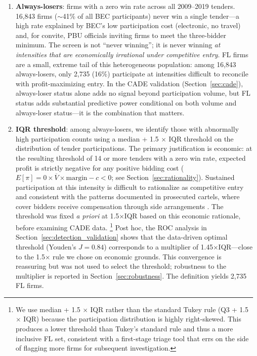 \begin{enumerate}
  \item \textbf{Always-losers}: firms with a zero win rate across all
    2009--2019 tenders. 16,843 firms ($\sim$41\% of all
    BEC participants) never win a single tender---a high rate
    explained by BEC's low participation cost (electronic, no travel)
    and, for convite, PBU officials inviting firms to meet the
    three-bidder minimum. The screen is not ``never winning''; it is
    never winning \emph{at intensities that are economically irrational
    under competitive entry}. FL firms are a small, extreme tail of
    this heterogeneous population: among 16,843 always-losers, only
    2,735 (16\%) participate at intensities difficult to reconcile with
    profit-maximizing entry. In the CADE validation
    (Section~\ref{sec:cade}), always-loser status alone adds no signal
    beyond participation volume, but FL status adds substantial
    predictive power conditional on both volume and always-loser
    status---it is the combination that matters.
  \item \textbf{IQR threshold}: among always-losers, we identify those
    with abnormally high participation counts using a median + 1.5
    $\times$ IQR threshold on the distribution of tender
    participations. The primary justification is economic: at the
    resulting threshold of 14 or more tenders with a zero win rate,
    expected profit is strictly negative for any positive bidding cost
    ($E[\pi] = 0 \times \overline{V} \times \text{margin} - c < 0$;
    see Section~\ref{sec:rationality}). Sustained participation at this
    intensity is difficult to rationalize as competitive entry and
    consistent with the patterns documented in prosecuted cartels,
    where cover bidders receive compensation through side arrangements
    \citep{asker2010leniency, marshall2012economics}. The
    threshold was fixed \emph{a priori} at 1.5$\times$IQR based on
    this economic rationale, before examining CADE data.%
    \footnote{We use median + 1.5 $\times$ IQR rather than the standard
    Tukey rule (Q3 + 1.5 $\times$ IQR) because the participation
    distribution is highly right-skewed. This produces a lower threshold
    than Tukey's standard rule and thus a more inclusive FL set,
    consistent with a first-stage triage tool that errs on the side of
    flagging more firms for subsequent investigation.}
    Post hoc, the ROC analysis in
    Section~\ref{sec:detection_validation} shows that the
    data-driven optimal threshold (Youden's $J = 0.84$) corresponds
    to a multiplier of 1.45$\times$IQR---close to the 1.5$\times$
    rule we chose on economic grounds. This convergence is reassuring
    but was not used to select the threshold; robustness to the
    multiplier is reported in Section~\ref{sec:robustness}.
    The definition yields 2,735 FL firms.
\end{enumerate}


